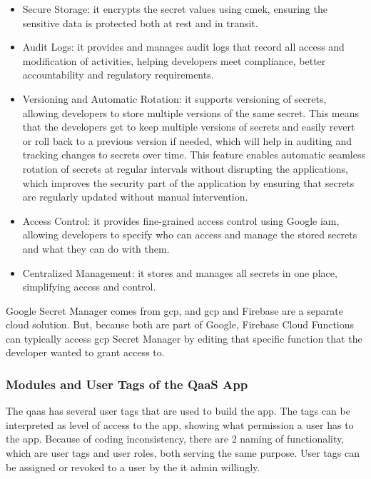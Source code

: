 \begin{multicols}{2}
      \begin{itemize}
            \item Secure Storage: it encrypts the secret values using \acrshort{cmek}, ensuring the sensitive data is protected
                  both at rest and in transit.
            \item Audit Logs: it provides and manages audit logs that record all access and modification of activities, helping
                  developers meet compliance, better accountability and regulatory requirements.
            \item Versioning and Automatic Rotation: it supports versioning of secrets, allowing developers to store multiple versions
                  of the same secret. This means that the developers get to keep multiple versions of secrets and easily revert or roll
                  back to a previous version if needed, which will help in auditing and tracking changes to secrets over time. This feature
                  enables automatic seamless rotation of secrets at regular intervals without  disrupting the applications, which improves
                  the security part of the application by ensuring that secrets are regularly updated without manual intervention.
            \item Access Control: it provides fine-grained access control using Google \acrshort{iam}, allowing developers to specify
                  who can access and manage the stored secrets and what they can do with them.
            \item Centralized Management: it stores and manages all secrets in one place, simplifying access and control.
      \end{itemize}

      Google Secret Manager comes from \acrshort{gcp}, and \acrshort{gcp} and Firebase are a separate cloud solution. But, because
      both are part of Google, Firebase Cloud Functions can typically access \acrshort{gcp} Secret Manager by editing that specific function
      that the developer wanted to grant access to.

      \subsubsection{Modules and User Tags  of the QaaS App} %

      The \acrshort{qaas} has several user tags that are used to build the app. The tags can be interpreted as level of access to the app,
      showing what permission a user has to the app. Because of coding inconsistency, there are 2 naming of functionality, which are user
      tags and user roles, both serving the same purpose. User tags can be assigned or revoked to a user by the \acrshort{it} admin
      willingly.


\end{multicols}

